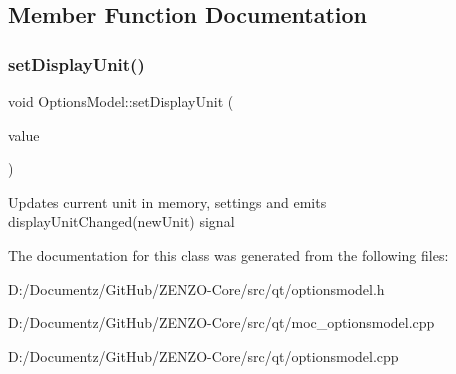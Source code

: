 \subsection{Member Function Documentation}
\mbox{\label{class_options_model_a42efacc748130848acc20247a7ed4617}} 
\subsubsection{\texorpdfstring{setDisplayUnit()}{setDisplayUnit()}}
{\footnotesize\ttfamily void Options\+Model\+::set\+Display\+Unit (\begin{DoxyParamCaption}\item[{const Q\+Variant \&}]{value }\end{DoxyParamCaption})}

Updates current unit in memory, settings and emits display\+Unit\+Changed(new\+Unit) signal 

The documentation for this class was generated from the following files\+:\begin{DoxyCompactItemize}
\item 
D\+:/\+Documentz/\+Git\+Hub/\+Z\+E\+N\+Z\+O-\/\+Core/src/qt/optionsmodel.\+h\item 
D\+:/\+Documentz/\+Git\+Hub/\+Z\+E\+N\+Z\+O-\/\+Core/src/qt/moc\+\_\+optionsmodel.\+cpp\item 
D\+:/\+Documentz/\+Git\+Hub/\+Z\+E\+N\+Z\+O-\/\+Core/src/qt/optionsmodel.\+cpp\end{DoxyCompactItemize}
